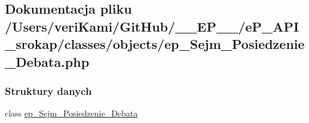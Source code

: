 \hypertarget{ep___sejm___posiedzenie___debata_8php}{\subsection{Dokumentacja pliku /\-Users/veri\-Kami/\-Git\-Hub/\-\_\-\-\_\-\-E\-P\-\_\-\-\_\-/e\-P\-\_\-\-A\-P\-I\-\_\-srokap/classes/objects/ep\-\_\-\-Sejm\-\_\-\-Posiedzenie\-\_\-\-Debata.php}
\label{ep___sejm___posiedzenie___debata_8php}
}
\subsubsection*{Struktury danych}
\begin{DoxyCompactItemize}
\item 
class \hyperlink{classep___sejm___posiedzenie___debata}{ep\-\_\-\-Sejm\-\_\-\-Posiedzenie\-\_\-\-Debata}
\end{DoxyCompactItemize}

